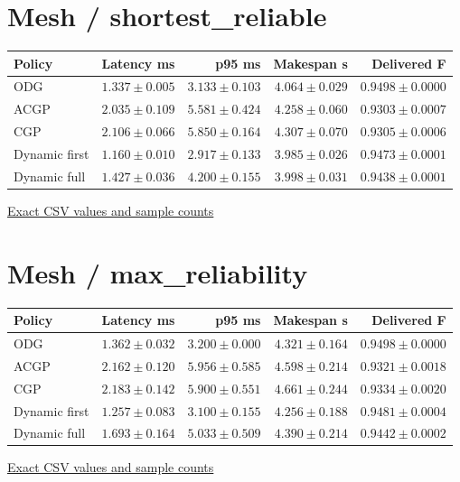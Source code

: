 \section*{Mesh / shortest\_reliable}
\begin{center}{\scriptsize\setlength{\tabcolsep}{3pt}
\begin{tabular}{lrrrr}
\toprule
Policy & Latency ms & p95 ms & Makespan s & Delivered F \\
\midrule
ODG & $1.337\pm0.005$ & $3.133\pm0.103$ & $4.064\pm0.029$ & $0.9498\pm0.0000$ \\
ACGP & $2.035\pm0.109$ & $5.581\pm0.424$ & $4.258\pm0.060$ & $0.9303\pm0.0007$ \\
CGP & $2.106\pm0.066$ & $5.850\pm0.164$ & $4.307\pm0.070$ & $0.9305\pm0.0006$ \\
Dynamic first & $1.160\pm0.010$ & $2.917\pm0.133$ & $3.985\pm0.026$ & $0.9473\pm0.0001$ \\
Dynamic full & $1.427\pm0.036$ & $4.200\pm0.155$ & $3.998\pm0.031$ & $0.9438\pm0.0001$ \\
\bottomrule\end{tabular}}
{\footnotesize\href{https://github.com/sanjeevkrishnaa/Compiler-Driven-ACE/blob/codex/ace-scheduler-correctness/docs/latex/qft96_final/data/matched_m4_c3.csv}{Exact CSV values and sample counts}}
\end{center}
\section*{Mesh / max\_reliability}
\begin{center}{\scriptsize\setlength{\tabcolsep}{3pt}
\begin{tabular}{lrrrr}
\toprule
Policy & Latency ms & p95 ms & Makespan s & Delivered F \\
\midrule
ODG & $1.362\pm0.032$ & $3.200\pm0.000$ & $4.321\pm0.164$ & $0.9498\pm0.0000$ \\
ACGP & $2.162\pm0.120$ & $5.956\pm0.585$ & $4.598\pm0.214$ & $0.9321\pm0.0018$ \\
CGP & $2.183\pm0.142$ & $5.900\pm0.551$ & $4.661\pm0.244$ & $0.9334\pm0.0020$ \\
Dynamic first & $1.257\pm0.083$ & $3.100\pm0.155$ & $4.256\pm0.188$ & $0.9481\pm0.0004$ \\
Dynamic full & $1.693\pm0.164$ & $5.033\pm0.509$ & $4.390\pm0.214$ & $0.9442\pm0.0002$ \\
\bottomrule\end{tabular}}
{\footnotesize\href{https://github.com/sanjeevkrishnaa/Compiler-Driven-ACE/blob/codex/ace-scheduler-correctness/docs/latex/qft96_final/data/matched_m4_c3.csv}{Exact CSV values and sample counts}}
\end{center}
